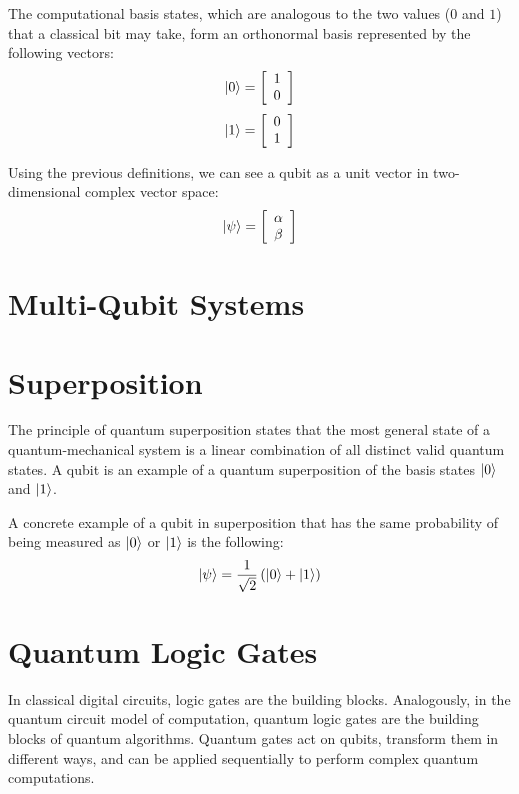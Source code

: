 The computational basis states, which are analogous to the two values ($0$ and $1$) that a classical bit may take, form an orthonormal basis represented by the following vectors:
$$\left|{0}\right\rangle=\left[\begin{array}{c}1 \\ 0\end{array}\right]$$
$$\left|{1}\right\rangle=\left[\begin{array}{c}0 \\ 1\end{array}\right]$$

Using the previous definitions, we can see a qubit as a unit vector in two-dimensional complex vector space:
\[\left|{\psi}\right\rangle=\left[\begin{array}{c}\alpha \\ \beta\end{array}\right]\]

\section{Multi-Qubit Systems}


\section{Superposition}

The principle of quantum superposition states that the most general state of a quantum-mechanical system is a linear combination of all distinct valid quantum states. A qubit is an example of a quantum superposition of the basis states $\left|{0}\right\rangle$ and $\left|{1}\right\rangle$.

A concrete example of a qubit in superposition that has the same probability of being measured as $\left|{0}\right\rangle$ or $\left|{1}\right\rangle$ is the following:
$$\left|{\psi}\right\rangle=\frac{1}{\sqrt{2}}\left(\left|{0}\right\rangle+\left|{1}\right\rangle\right)$$


\section{Quantum Logic Gates}

In classical digital circuits, logic gates are the building blocks. Analogously, in the quantum circuit model of computation, quantum logic gates are the building blocks of quantum algorithms. Quantum gates act on qubits, transform them in different ways, and can be applied sequentially to perform complex quantum computations.

